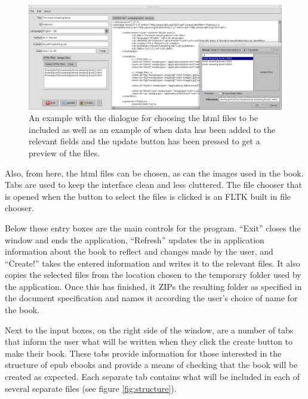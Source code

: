 \documentclass[11pt]{article} %
\begin{document}
\begin{figure}[ht]
  \centering
  \includegraphics[width=0.9\columnwidth]{example.png}
  \caption{\label{fig:example}An example with the dialogue for choosing the html files to be included as well as an example of when data has been added to the relevant fields and the update button has been pressed to get a preview of the files.} 
\end{figure}

%    

Also, from here, the html files can be chosen, as can the images used in the book. Tabs are used to keep the interface clean and less cluttered. The file chooser that is opened when the button to select the files is clicked is an FLTK built in file chooser.

Below these entry boxes are the main controls for the program. ``Exit'' closes the window and ends the application, ``Refresh'' updates the in application information about the book to reflect and changes made by the user, and ``Create!'' takes the entered information and writes it to the relevant files. It also copies the selected files from the location chosen to the temporary folder used by the application. Once this has finished, it ZIPs the resulting folder as specified in the document specification and names it according the user's choice of name for the book.

Next to the input boxes, on the right side of the window, are a number of tabs that inform the user what will be written when they click the create button to make their book. These tabs provide information for those interested in the structure of epub ebooks and provide a means of checking that the book will be created as expected. Each separate tab contains what will be included in each of several separate files (see figure \ref{fig:structure}).
\end{document}

